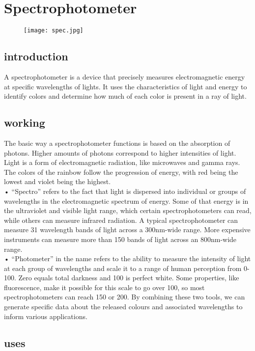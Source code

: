 \documentclass[12pt]{article}
\begin{document}
\section{Spectrophotometer}
\begin{figure}
\centering
\texttt{[image: spec.jpg]}
\end{figure}
\subsection{introduction}
A spectrophotometer is a device that precisely measures electromagnetic energy at specific wavelengths of lights. It uses the characteristics of light and
energy to identify colors and determine how much of each color is present in
a ray of light.
\subsection{working}
The basic way a spectrophotometer functions is based on the absorption of
photons. Higher amounts of photons correspond to higher intensities of light.
Light is a form of electromagnetic radiation, like microwaves and gamma rays. The colors of the rainbow follow the progression of energy, with red
being the lowest and violet being the highest.\\
• “Spectro” refers to the fact that light is dispersed into individual or
groups of wavelengths in the electromagnetic spectrum of energy. Some
of that energy is in the ultraviolet and visible light range, which certain
spectrophotometers can read, while others can measure infrared radiation. A typical spectrophotometer can measure 31 wavelength bands
of light across a 300nm-wide range. More expensive instruments can
measure more than 150 bands of light across an 800nm-wide range.\\
• “Photometer” in the name refers to the ability to measure the intensity
of light at each group of wavelengths and scale it to a range of human
perception from 0-100. Zero equals total darkness and 100 is perfect
white. Some properties, like fluorescence, make it possible for this scale
to go over 100, so most spectrophotometers can reach 150 or 200.
By combining these two tools, we can generate specific data about the released colours and associated wavelengths to inform various applications.
\subsection{uses}
\end{document}
